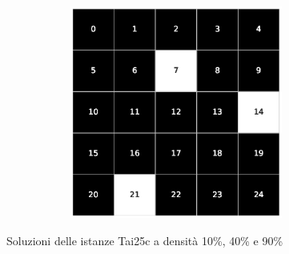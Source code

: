 \begin{figure}[h!]
\begin{subfigure}[b]{\textwidth}
\begin{subfigure}[b]{0.20\textwidth}
        \end{subfigure}
        \hspace{3em}
        \begin{subfigure}[b]{0.20\textwidth}
            \includegraphics[width=\columnwidth]{images/Tai25c_5x5_90.eps}
        \end{subfigure}
     \end{subfigure}
     \caption{Soluzioni delle istanze Tai25c a densità 10\%, 40\% e 90\%}
\end{figure}

